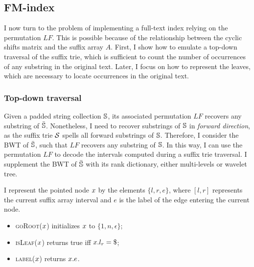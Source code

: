 
\subsection{FM-index}
\label{sub:fmtrie}

I now turn to the problem of implementing a full-text index relying on the permutation $LF$.
This is possible because of the relationship between the cyclic shifts matrix and the suffix array $A$.
First, I show how to emulate a top-down traversal of the suffix trie, which is sufficient to count the number of occurrences of any substring in the original text.
Later, I focus on how to represent the leaves, which are necessary to locate occurrences in the original text.

\subsubsection{Top-down traversal}

Given a padded string collection $\mathbb {S}$, its associated permutation $LF$ recovers any substring of $\bar{\mathbb {S}}$.
Nonetheless, I need to recover substrings of $\mathbb {S}$ in \emph{forward direction}, as the suffix trie $\mathcal {S}$ spells all forward substrings of $\mathbb {S}$.
Therefore, I consider the BWT of $\bar{\mathbb {S}}$, such that $LF$ recovers any substring of $\mathbb {S}$.
In this way, I can use the permutation $LF$ to decode the intervals computed during a suffix trie traversal.
I supplement the BWT of $\bar{\mathbb {S}}$ with its rank dictionary, either multi-levels or wavelet tree.

I represent the pointed node $x$ by the elements $\{ l, r, e \}$, where $[l,r]$ represents the current suffix array interval and $e$ is the label of the edge entering the current node.
\begin{itemize}
\item \textsc{goRoot}($x$) initializes $x$ to $\{ 1, n, \epsilon \}$;
\item \textsc{isLeaf}($x$) returns true iff $\Tn.l_r = \$$;
\item \textsc{label}($x$) returns $x.e$.
\end{itemize}

